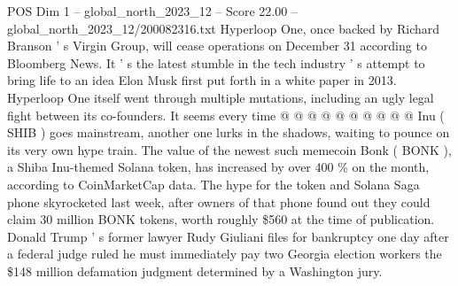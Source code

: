 \begin{textsample}{POS Dim 1 – global\_north\_2023\_12 – Score 22.00 – global\_north\_2023\_12/200082316.txt}
Hyperloop One, once backed by Richard Branson ' s Virgin Group, will cease operations on December 31 according to Bloomberg News.
It ' s the latest stumble in the tech industry ' s attempt to bring life to an idea Elon Musk first put forth in a white paper in 2013.
Hyperloop One itself went through multiple mutations, including an ugly legal fight between its co-founders.
It seems every time @ @ @ @ @ @ @ @ @ @ Inu ( SHIB ) goes mainstream, another one lurks in the shadows, waiting to pounce on its very own hype train.
The value of the newest such memecoin Bonk ( BONK ), a Shiba Inu-themed Solana token, has increased by over 400 \% on the month, according to CoinMarketCap data.
The hype for the token and Solana Saga phone skyrocketed last week, after owners of that phone found out they could claim 30 million BONK tokens, worth roughly \$560 at the time of publication.
Donald Trump ' s former lawyer Rudy Giuliani files for bankruptcy one day after a federal judge ruled he must immediately pay two Georgia election workers the \$148 million defamation judgment determined by a Washington jury.

\end{textsample}
